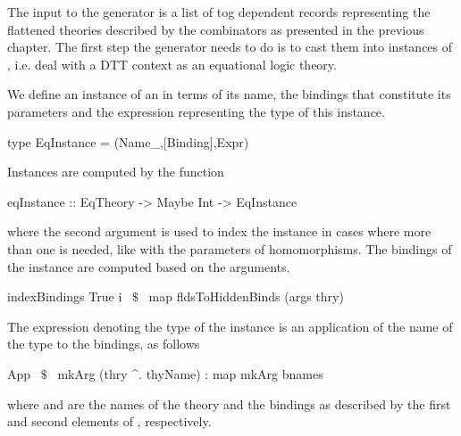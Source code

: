 The input to the generator is a list of tog dependent records representing the flattened theories described by the combinators as presented in the previous chapter. The first step the generator needs to do is to cast them into instances of , i.e. deal with a DTT context as an equational logic theory. 
\begin{comment}
This is done using the function \lstmath{recordToEqTheory}. 
\begin{hscode}
recordToEqTheory :: TRecord -> Eq.EqTheory
recordToEqTheory record@(TRecord nm params _) =
  Eq.build (nm^.name) 
    (getRecordSort record)
    (getRecordComps isFunc record)
    (getRecordComps isAxiom record)
    (paramsNum params)
\end{hscode}
In tog, records definitions are declared using the \lstmath{Record} constructor of the type \lstmath{Decl}, which contains many other constructors used to define functions, types, and others. We prefer to use a type dedicated to records, and therefore use the \lstmath{TRecord} type instead. \lstmath{TRecord} has the exact same parameters as the \lstmath{Record} constructor. 
\end{comment}

We define an instance of an  in terms of its name, the bindings that constitute its parameters and the expression representing the type of this instance. 
\begin{hscode}
type EqInstance = (Name_,[Binding],Expr) 
\end{hscode}
Instances are computed by the function 
\begin{hscode} 
eqInstance :: EqTheory -> Maybe Int -> EqInstance
\end{hscode}
where the second argument is used to index the instance in cases where more than one is needed, like with the parameters of homomorphisms. The bindings of the instance are computed based on the arguments. 
\begin{hscode}
 indexBindings True i ~$\$$~ map fldsToHiddenBinds (args thry)
\end{hscode}
The expression denoting the type of the instance is an application of the name of the type to the bindings, as follows 
\begin{hscode}
 App ~$\$$~ mkArg (thry ^. thyName) : map mkArg bnames
\end{hscode} 
where  and  are the names of the theory and the bindings as described by the first and second elements of , respectively. 

